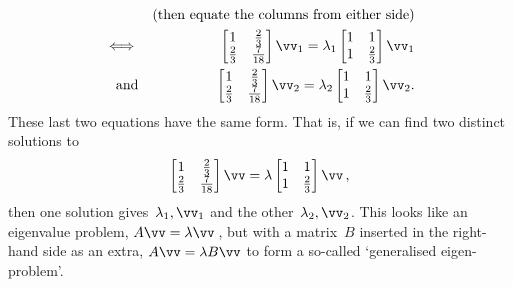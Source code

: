 \begin{example}
\begin{solution}
\begin{enumerate}
\begin{eqnarray*}
\\&&(\text{then equate the columns from either side})
\\\iff&&\begin{bmatrix} 1&\tfrac23\\\tfrac23&\frac7{18} \end{bmatrix}\vv_1=\lambda_1\begin{bmatrix} 1&1\\1&\tfrac23 \end{bmatrix}\vv_1
\\\text{and}&&\begin{bmatrix} 1&\tfrac23\\\tfrac23&\frac7{18} \end{bmatrix}\vv_2=\lambda_2\begin{bmatrix} 1&1\\1&\tfrac23 \end{bmatrix}\vv_2.
\end{eqnarray*}
These last two equations have the same form.
That is, if we can find two distinct solutions to
\begin{equation*}
\begin{bmatrix} 1&\tfrac23\\\tfrac23&\frac7{18} \end{bmatrix}\vv=\lambda\begin{bmatrix} 1&1\\1&\tfrac23 \end{bmatrix}\vv\,,
\end{equation*}
then one solution gives~\(\lambda_1,\vv_1\) and the other~\(\lambda_2,\vv_2\).
This looks like an eigenvalue problem, \(A\vv=\lambda\vv\)\,, but with a matrix~\(B\) inserted in the right-hand side as an extra, \(A\vv=\lambda B\vv\) to form a so-called `generalised eigen-problem'.


\end{enumerate}
\end{solution}
\end{example}
